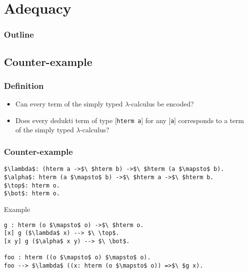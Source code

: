 \section{Adequacy}

\begin{frame}
\frametitle{Outline}

\tableofcontents[currentsection]
\end{frame}


\subsection{Counter-example}

\begin{frame}
\frametitle{Definition}

\begin{itemize}
\item Can every term of the simply typed $\lambda$-calculus be encoded?
\vspace{0.5cm}
\item Does every dedukti term of type [\lstinline!hterm a!] for any
  [\lstinline!a!] corresponds to a term of the simply typed
  $\lambda$-calculus?
\end{itemize}

\end{frame}


\begin{frame}[fragile]
\frametitle{Counter-example}

\begin{lstlisting}
$\lambda$: (hterm a ->$\ $hterm b) ->$\ $hterm (a $\mapsto$ b).
$\alpha$: hterm (a $\mapsto$ b) ->$\ $hterm a ->$\ $hterm b.
$\top$: hterm o.
$\bot$: hterm o.
\end{lstlisting}

\begin{block}{Example}
\begin{lstlisting}
g : hterm (o $\mapsto$ o) ->$\ $hterm o.
[x] g ($\lambda$ x) --> $\ \top$.
[x y] g ($\alpha$ x y) --> $\ \bot$.

foo : hterm ((o $\mapsto$ o) $\mapsto$ o).
foo --> $\lambda$ ((x: hterm (o $\mapsto$ o)) =>$\ $g x).
\end{lstlisting}
\end{block}

\end{frame}



